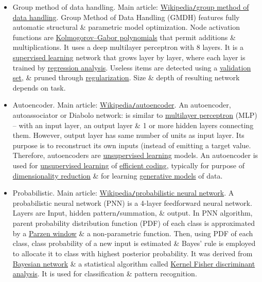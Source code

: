 \documentclass{article}
\begin{document}
\begin{itemize}
	\item {\sf Group method of data handling.} Main article: \href{https://en.wikipedia.org/wiki/Group_method_of_data_handling}{Wikipedia{\tt/}group method of data handling}. Group Method of Data Handling (GMDH) features fully automatic structural \& parametric model optimization. Node activation functions are \href{https://en.wikipedia.org/wiki/Wiener_series}{Kolmogorov--Gabor polynomials} that permit additions \& multiplications. It uses a deep multilayer perceptron with 8 layers. It is a \href{https://en.wikipedia.org/wiki/Supervised_learning}{supervised learning} network that grows layer by layer, where each layer is trained by \href{https://en.wikipedia.org/wiki/Regression_analysis}{regression analysis}. Useless items are detected using a \href{https://en.wikipedia.org/wiki/Validation_set}{validation set}, \& pruned through \href{https://en.wikipedia.org/wiki/Regularization_(mathematics)}{regularization}. Size \& depth of resulting network depends on task.
	\item {\sf Autoencoder.} Main article: \href{https://en.wikipedia.org/wiki/Autoencoder}{Wikipedia{\tt/}autoencoder}. An autoencoder, autoassociator or Diabolo network: is similar to \href{https://en.wikipedia.org/wiki/Multilayer_perceptron}{multilayer perceptron} (MLP) -- with an input layer, an output layer \& 1 or more hidden layers connecting them. However, output layer has same number of units as input layer. Its purpose is to reconstruct its own inputs (instead of emitting a target value. Therefore, autoencoders are \href{https://en.wikipedia.org/wiki/Unsupervised_learning}{unsupervised learning} models. An autoencoder is used for \href{https://en.wikipedia.org/wiki/Unsupervised_learning}{unsupervised learning} of \href{https://en.wikipedia.org/wiki/Feature_learning}{efficient coding}, typically for purpose of \href{https://en.wikipedia.org/wiki/Dimensionality_reduction}{dimensionality reduction} \& for learning \href{https://en.wikipedia.org/wiki/Generative_model}{generative models} of data.
	\item {\sf Probabilistic.} Main article: \href{https://en.wikipedia.org/wiki/Probabilistic_neural_network}{Wikipedia{\tt/}probabilistic neural network}. A probabilistic neural network (PNN) is a 4-layer feedforward neural network. Layers are Input, hidden pattern{\tt/}summation, \& output. In PNN algorithm, parent probability distribution function (PDF) of each class is approximated by a \href{https://en.wikipedia.org/wiki/Kernel_density_estimation}{Parzen window} \& a non-parametric function. Then, using PDF of each class, class probability of a new input is estimated \& Bayes' rule is employed to allocate it to class with highest posterior probability. It was derived from \href{https://en.wikipedia.org/wiki/Bayesian_network}{Bayesian network} \& a statistical algorithm called \href{https://en.wikipedia.org/wiki/Kernel_Fisher_discriminant_analysis}{Kernel Fisher discriminant analysis}. It is used for classification \& pattern recognition.

\end{itemize}
\end{document}
